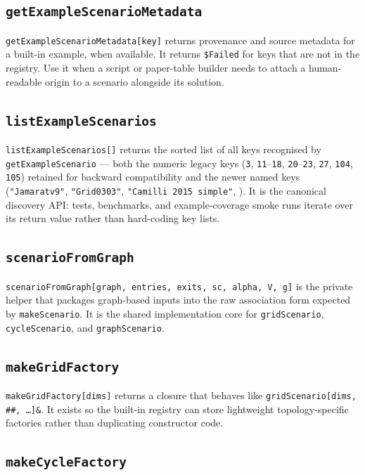 \documentclass[11pt]{article}
\begin{document}
\subsection*{\texttt{getExampleScenarioMetadata}}

\texttt{getExampleScenarioMetadata[key]} returns provenance and source metadata for a built-in example, when available. It returns \texttt{\$Failed} for keys that are not in the registry. Use it when a script or paper-table builder needs to attach a human-readable origin to a scenario alongside its solution.

\subsection*{\texttt{listExampleScenarios}}

\texttt{listExampleScenarios[]} returns the sorted list of all keys recognised by \texttt{getExampleScenario} --- both the numeric legacy keys (\texttt{3}, \texttt{11}--\texttt{18}, \texttt{20}--\texttt{23}, \texttt{27}, \texttt{104}, \texttt{105}) retained for backward compatibility and the newer named keys (\texttt{"Jamaratv9"}, \texttt{"Grid0303"}, \texttt{"Camilli 2015 simple"}, \textellipsis). It is the canonical discovery API: tests, benchmarks, and example-coverage smoke runs iterate over its return value rather than hard-coding key lists.

\subsection*{\texttt{scenarioFromGraph}}

\texttt{scenarioFromGraph[graph, entries, exits, sc, alpha, V, g]} is the private helper that packages graph-based inputs into the raw association form expected by \texttt{makeScenario}. It is the shared implementation core for \texttt{gridScenario}, \texttt{cycleScenario}, and \texttt{graphScenario}.

\subsection*{\texttt{makeGridFactory}}

\texttt{makeGridFactory[dims]} returns a closure that behaves like \texttt{gridScenario[dims, \#\#, \ldots]\&}. It exists so the built-in registry can store lightweight topology-specific factories rather than duplicating constructor code.

\subsection*{\texttt{makeCycleFactory}}
\end{document}

